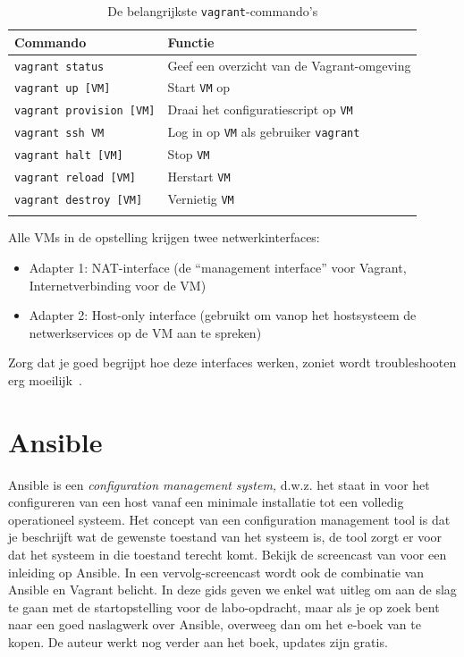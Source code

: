 \begin{longtable}{@{}ll@{}}
  \toprule
  Commando & Functie\tabularnewline
  \midrule
  \endhead
  \texttt{vagrant\ status} & Geef een overzicht van de Vagrant-omgeving\tabularnewline
  \texttt{vagrant\ up\ [VM]} & Start \texttt{VM} op\tabularnewline
  \texttt{vagrant\ provision\ [VM]} & Draai het configuratiescript op \texttt{VM}\tabularnewline
  \texttt{vagrant\ ssh\ VM} & Log in op \texttt{VM} als gebruiker \texttt{vagrant}\tabularnewline
  \texttt{vagrant\ halt\ [VM]} & Stop \texttt{VM}\tabularnewline
  \texttt{vagrant\ reload\ [VM]} & Herstart \texttt{VM}\tabularnewline
  \texttt{vagrant\ destroy\ [VM]} & Vernietig \texttt{VM}\tabularnewline
  \bottomrule
\caption{De belangrijkste \texttt{vagrant}-commando's}
\label{tab:vagrant-commandos}
\end{longtable}

Alle VMs in de opstelling krijgen twee netwerkinterfaces:

\begin{itemize}
  \item Adapter 1: NAT-interface (de ``management interface'' voor Vagrant, Internetverbinding voor de VM)
  \item Adapter 2: Host-only interface (gebruikt om vanop het hostsysteem de netwerkservices op de VM aan te spreken)
\end{itemize}

Zorg dat je goed begrijpt hoe deze interfaces werken, zoniet wordt troubleshooten erg moeilijk~\autocite{VanVreckem2015a}.

\section{Ansible}
\label{sec:ansible}

Ansible is een \emph{configuration management system,} d.w.z. het staat in voor het configureren van een host vanaf een minimale installatie tot een volledig operationeel systeem. Het concept van een configuration management tool is dat je beschrijft wat de gewenste toestand van het systeem is, de tool zorgt er voor dat het systeem in die toestand terecht komt. Bekijk de screencast van \textcite{Weissig2015} voor een inleiding op Ansible. In een vervolg-screencast wordt ook de combinatie van Ansible en Vagrant belicht. In deze gids geven we enkel wat uitleg om aan de slag te gaan met de startopstelling voor de labo-opdracht, maar als je op zoek bent naar een goed naslagwerk over Ansible, overweeg dan om het e-boek van \textcite{Geerling2016} te kopen. De auteur werkt nog verder aan het boek, updates zijn gratis.

